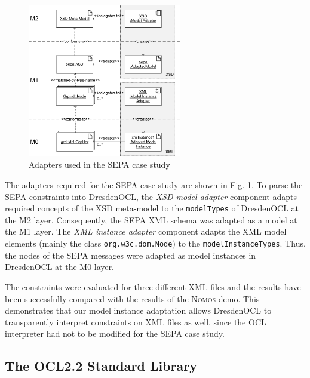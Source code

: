 \begin{figure}[!t]
	\centering
		\includegraphics[width=0.60\textwidth]{figures/casestudy02.pdf}
	\caption{Adapters used in the SEPA case study
	  }
	\label{fig:casestudy02}
\end{figure}

The adapters required for the SEPA case study are shown in Fig.
\ref{fig:casestudy02}. To parse the SEPA constraints
into DresdenOCL, the \textit{XSD model adapter} component adapts required concepts of the 
XSD meta-model to the \texttt{model\-Types} of DresdenOCL at the M2 layer. 
Consequently, the SEPA XML schema was adapted as a model at the M1 layer.
The \textit{XML instance adapter} component 
adapts the XML model elements (mainly the class \texttt{org.w3c.dom.Node}) to the \texttt{model\-Instance\-Types}. 
Thus, the nodes of the SEPA messages
were adapted as model instances in DresdenOCL at the M0 layer.

The constraints were evaluated for three different XML files 
and the results have been successfully compared with the results of the \textsc{Nomos} demo.
This demonstrates that our model instance adaptation allows DresdenOCL to transparently interpret
constraints on XML files as well, since the OCL interpreter had not to be modified for the SEPA case study.


\subsection{The OCL2.2 Standard Library}

